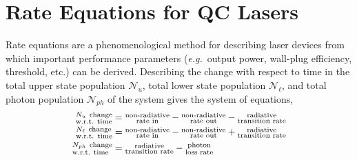 \documentclass[12pt]{report}
\begin{document}
\section{Rate Equations for QC Lasers}
Rate equations are a phenomenological method for describing laser devices from which important performance parameters (\emph{e.g.}\ output power, wall-plug efficiency, threshold, etc.) can be derived.  Describing the change with respect to time in the total upper state population $\mathcal{N}_u$, total lower state population $\mathcal{N}_\ell$, and total photon population $\mathcal{N}_{ph}$ of the system gives the system of equations,
\begin{subequations}
\begin{align}
\begin{subarray}\mathcal{N}_u~\tn{change}\\\tn{w.r.t. time}\end{subarray} &= \begin{subarray}{c}\tn{non-radiative}\\\tn{rate in}\end{subarray} - \begin{subarray}{c}\tn{non-radiative}\\\tn{rate out}\end{subarray} - \begin{subarray}{c}\tn{radiative}\\\tn{transition rate}\end{subarray}\\
\begin{subarray}\mathcal{N}_\ell~\tn{change}\\\tn{w.r.t. time}\end{subarray} &= \begin{subarray}{c}\tn{non-radiative}\\\tn{rate in}\end{subarray} - \begin{subarray}{c}\tn{non-radiative}\\\tn{rate out}\end{subarray} + \begin{subarray}{c}\tn{radiative}\\\tn{transition rate}\end{subarray}\\
\begin{subarray}\mathcal{N}_{ph}~\tn{change}\\\tn{w.r.t. time}\end{subarray} &= \begin{subarray}{c}\tn{radiative}\\\tn{transition rate}\end{subarray} - \begin{subarray}{c}\tn{photon}\\\tn{loss rate}\end{subarray}
\end{align}
\end{subequations}
\end{document}
